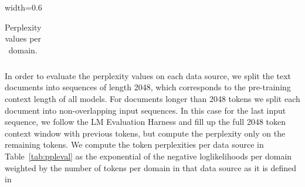 \documentclass[dvipsnames]{article}
\begin{document}
\begin{appendix}
\begin{table}[htbp]
\begin{adjustbox}{width=0.6\textwidth}
\begin{tabular}{llcrrrr}
    \bottomrule
\end{tabular}
    \end{adjustbox}
    \vspace{0.1cm}
    \caption{Perplexity values per domain.
    \label{tab:ppleval_app}
}
\end{table}
In order to evaluate the perplexity values on each data source,
we split the text documents into sequences of length 2048, which corresponds to the pre-training context length of all models.
For documents longer than 2048 tokens we split each document into non-overlapping input sequences.
In this case for the last input sequence, we follow the LM Evaluation Harness and fill up the full 2048 token context window with previous tokens, but compute the perplexity only on the remaining tokens.
We compute the token perplexities per data source in Table~\ref{tab:ppleval} as the exponential of the negative loglikelihoods per domain weighted by the number of tokens per domain in that data source as it is defined in \citet[Equation~1]{Magnusson:23arxivshort}
\clearpage

\end{appendix}
\end{document}
